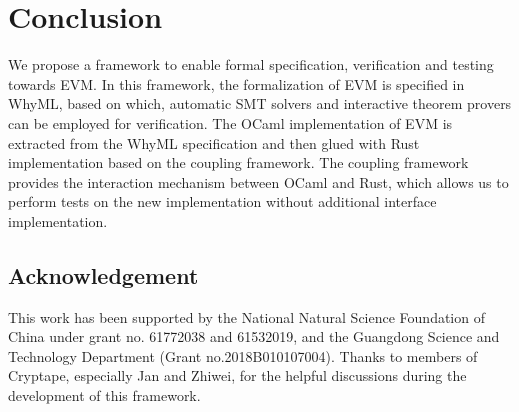\documentclass[runningheads]{llncs}
\begin{document}

\section{Conclusion}\label{Sec: Conclusion}
We propose a framework to enable formal specification, verification and testing towards EVM. 
In this framework, the formalization of EVM is specified in WhyML, 
based on which, automatic SMT solvers and interactive theorem provers can be employed for verification. 
The OCaml implementation of EVM is extracted from the WhyML specification and then glued with Rust implementation based on the coupling framework. The coupling framework provides the interaction mechanism between OCaml and Rust, which allows us to perform tests on the new implementation without additional interface implementation.

\subsection*{Acknowledgement}
\noindent This work has been supported by the National Natural Science Foundation of China under grant no. 61772038 and 61532019, and the Guangdong Science and Technology Department (Grant no.2018B010107004). Thanks to members of Cryptape, especially Jan and Zhiwei, for the helpful discussions during the development of this framework.




\end{document}
